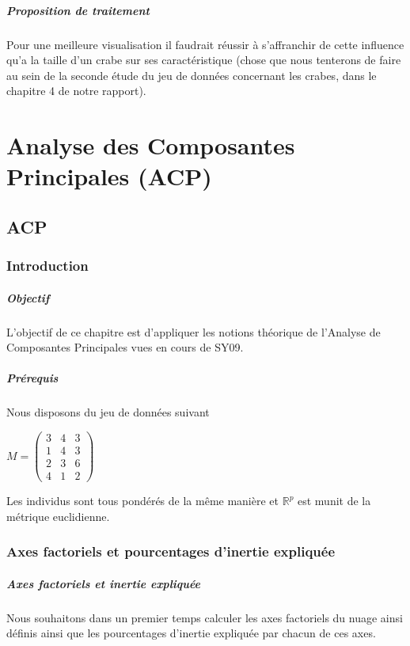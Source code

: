 \documentclass{report}
\begin{document}
\paragraph{Proposition de traitement}
Pour une meilleure visualisation il faudrait réussir à s'affranchir de cette influence qu'a la taille d'un crabe sur ses caractéristique (chose que nous tenterons de faire au sein de la seconde étude du jeu de données concernant les crabes, dans le chapitre 4 de notre rapport).

\newpage
\chapter{Analyse des Composantes Principales (ACP) }


\section{ACP}
\subsection{Introduction}
\paragraph{Objectif}
L'objectif de ce chapitre est d'appliquer les notions théorique de l'Analyse de
Composantes Principales vues en cours de SY09.
\paragraph{Prérequis}
Nous disposons du jeu de données suivant
\begin{center}
$M = \begin{pmatrix}
    3 & 4 & 3 \\
    1 & 4 & 3 \\
    2 & 3 & 6 \\
    4 & 1 & 2
\end{pmatrix}$
\end{center}
Les individus sont tous pondérés de la même manière et $\mathbb{R}^p$ est munit de
la métrique euclidienne.
\subsection {Axes factoriels et pourcentages d'inertie expliquée}
\paragraph{Axes factoriels et inertie expliquée}
Nous souhaitons dans un premier temps calculer les axes factoriels du nuage
ainsi définis ainsi que les pourcentages d'inertie expliquée par chacun de ces
axes.
\end{document}
